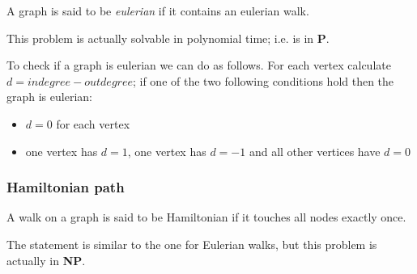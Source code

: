         A graph is said to be \textit{eulerian} if it contains an eulerian walk.

        This problem is actually solvable in polynomial time; i.e. is in \textbf{P}.

        To check if a graph is eulerian we can do as follows.
        For each vertex calculate $d = indegree - outdegree$; if one of the two following conditions hold then the graph is eulerian:
        \begin{itemize}
            \item $d=0$ for each vertex
            \item one vertex has $d=1$, one vertex has $d=-1$ and all other vertices have $d=0$
        \end{itemize}

    \subsubsection{Hamiltonian path}\label{subsubsec:problem_hamiltonianpath}
        \begin{definition}
            A walk on a graph is said to be Hamiltonian if it touches all nodes exactly once.
        \end{definition}

        The statement is similar to the one for Eulerian walks, but this problem is actually in \textbf{NP}.